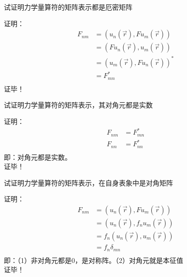 \begin{frame} [allowframebreaks=]
    \begin{tcolorbox}[colback=yellow!5,colframe=yellow!75!black,title=性质1]
        试证明力学量算符的矩阵表示都是厄密矩阵
    \end{tcolorbox}
    \alert{证明：} 
    \begin{equation*}
        \begin{split}
            F_{nm}&=(u_n (\vec{r}), Fu_m(\vec{r}))\\
            &=(Fu_n (\vec{r}), u_m(\vec{r}))\\
            &=(u_m(\vec{r}), Fu_n (\vec{r}))^*\\
            &=F_{mn}^*\\
        \end{split} 
    \end{equation*}
    证毕！
\end{frame}

\begin{frame} [allowframebreaks=]
    \begin{tcolorbox}[colback=yellow!5,colframe=yellow!75!black,title=性质2]
        试证明力学量算符的矩阵表示，其对角元都是实数
    \end{tcolorbox}
    \alert{证明：} 
    \begin{equation*}
        \begin{split}
            F_{nm}&=F_{mn}^*\\
            F_{nn}&=F_{nn}^*\\
        \end{split} 
    \end{equation*}
    即：对角元都是实数。 \\
    证毕！
\end{frame}

\begin{frame} [allowframebreaks=]
    \begin{tcolorbox}[colback=yellow!5,colframe=yellow!75!black,title=性质3]
        试证明力学量算符的矩阵表示，在自身表象中是对角矩阵
    \end{tcolorbox}
    \alert{证明：} 
    \begin{equation*}
        \begin{split}
            F_{nm}&=(u_n (\vec{r}), Fu_m(\vec{r}))\\
            &=(u_n (\vec{r}), f_nu_m(\vec{r}))\\
            &=f_n(u_n (\vec{r}), u_m(\vec{r}))\\
            &=f_n\delta_{mn}\\
        \end{split} 
    \end{equation*}
    即：（1）非对角元都是0，是对称阵。（2）对角元就是本征值\\
    证毕！
\end{frame}

